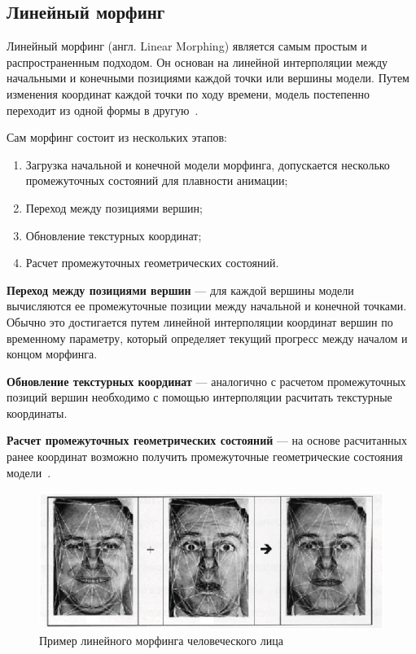 \subsection{Линейный морфинг}
Линейный морфинг (англ. Linear Morphing) является самым простым и распространенным подходом. 
Он основан на линейной интерполяции между начальными и конечными позициями каждой точки или вершины модели.
Путем изменения координат каждой точки по ходу времени, модель постепенно переходит из одной формы в другую~\cite{DMorph}.

Сам морфинг состоит из нескольких этапов: 
\begin{enumerate}
	\item Загрузка начальной и конечной модели морфинга, допускается несколько промежуточных состояний для плавности анимации;
	\item Переход между позициями вершин;
	\item Обновление текстурных координат;
	\item Расчет промежуточных геометрических состояний.
\end{enumerate}

\textbf{Переход между позициями вершин} --- для каждой вершины модели вычисляются ее промежуточные позиции между начальной и конечной точками.
Обычно это достигается путем линейной интерполяции координат вершин по временному параметру, который определяет текущий прогресс между началом и концом морфинга.

\textbf{Обновление текстурных координат} --- аналогично с расчетом промежуточных позиций вершин необходимо с помощью интерполяции расчитать текстурные координаты.

\textbf{Расчет промежуточных геометрических состояний} --- на основе расчитанных ранее координат возможно получить промежуточные геометрические состояния модели~\cite{DMorph}.

\begin{figure}[h]
	\centering
	\includegraphics{images/morhing_faces.png}
	\caption{Пример линейного морфинга человеческого лица}
	\label{fig:morhing_faces}
\end{figure}

